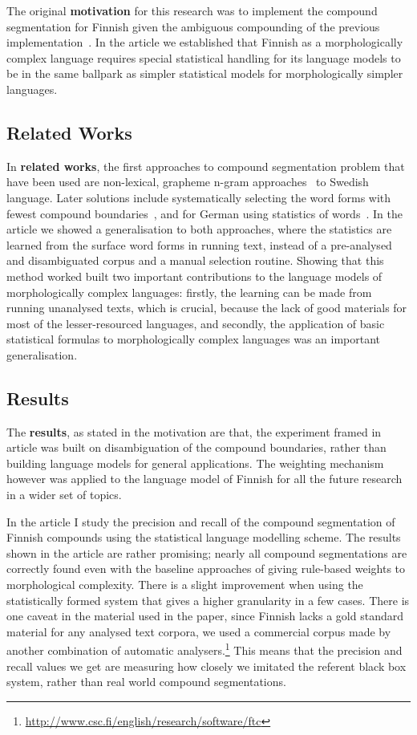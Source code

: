 \documentclass[officiallayout,final]{unihelcompling}
\begin{document}
The original \textbf{motivation} for this research was to implement the
compound segmentation for Finnish given the ambiguous compounding of the
previous implementation~\citep{pirinen2008suomen}. In the article we
established that Finnish as a morphologically complex language requires special
statistical handling for its language models to be in the same ballpark as
simpler statistical models for morphologically simpler languages.

\subsection{Related Works}

In \textbf{related works}, the first approaches to compound segmentation
problem that have been used are non-lexical, grapheme n-gram
approaches~\citep{kokkinakis2008semantically} to Swedish language. Later
solutions include systematically selecting the word forms with fewest compound
boundaries~\citep{karlsson1992swetwol}, and for German using statistics of
words~\citep{schiller2006german}. In the article we showed a generalisation to
both approaches, where the statistics are learned from the surface word forms
in running text, instead of a pre-analysed and disambiguated corpus and a
manual selection routine.  Showing that this method worked built two important
contributions to the language models of morphologically complex languages:
firstly, the learning can be made from running unanalysed texts, which is
crucial, because the lack of good materials for most of the lesser-resourced
languages, and secondly, the application of basic statistical formulas to
morphologically complex languages was an important generalisation.

\subsection{Results}

The \textbf{results}, as stated in the motivation are that, the experiment
framed in article was built on disambiguation of the compound boundaries,
rather than building language models for general applications. The weighting
mechanism however was applied to the language model of Finnish for all the
future research in a wider set of topics.

In the article I study the precision and recall of the compound segmentation of
Finnish compounds using the statistical language modelling scheme. The results
shown in the article are rather promising; nearly all compound segmentations
are correctly found even with the baseline approaches of giving rule-based
weights to morphological complexity. There is a slight improvement when using
the statistically formed system that gives a higher granularity in a few cases.
There is one caveat in the material used in the paper, since Finnish lacks a
gold standard material for any analysed text corpora, we used a commercial
corpus made by another combination of automatic
analysers.\footnote{\url{http://www.csc.fi/english/research/software/ftc}} This
means that the precision and recall values we get are measuring how closely we
imitated the referent black box system, rather than real world compound
segmentations.
\end{document}
